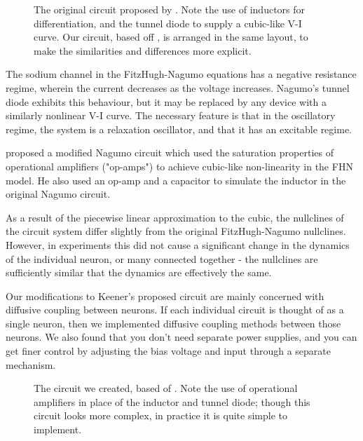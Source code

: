\documentclass[
    11pt,
]{article}
\begin{document}
\begin{figure}[h!]
    \centering
    \caption{The original circuit proposed by \citet{nagumo1962}.  Note the use of inductors for differentiation, and the tunnel diode to supply a cubic-like V-I curve.  Our circuit, based off \citet{keener1983}, is arranged in the same layout, to make the similarities and differences more explicit.}
    \label{fig: nagumo_ckt}
\end{figure}


The sodium channel in the FitzHugh-Nagumo equations has a negative resistance regime, wherein the current decreases as the voltage increases.  Nagumo's tunnel diode exhibits this behaviour, but it may be replaced by any device with a similarly nonlinear V-I curve.  The necessary feature is that in the oscillatory regime, the system is a relaxation oscillator, and that it has an excitable regime.

\citet{keener1983} proposed a modified Nagumo circuit which used the saturation properties of operational amplifiers ("op-amps") to achieve cubic-like non-linearity in the FHN model. He also used an op-amp and a capacitor to simulate the inductor in the original Nagumo circuit.

As a result of the piecewise linear approximation to the cubic, the nullclines of the circuit system differ slightly from the original FitzHugh-Nagumo nullclines.  However, in experiments this did not cause a significant change in the dynamics of the individual neuron, or many connected together - the nullclines are sufficiently similar that the dynamics are effectively the same.

Our modifications to Keener's proposed circuit are mainly concerned with diffusive coupling between neurons.  If each individual circuit is thought of as a single neuron, then we implemented diffusive coupling methods between those neurons.  We also found that you don't need separate power supplies, and you can get finer control by adjusting the bias voltage and input through a separate mechanism.

\begin{figure}[h!]
    \centering
    \caption{The circuit we created, based of \citet{keener1983}.  Note the use of operational amplifiers in place of the inductor and tunnel diode; though this circuit looks more complex, in practice it is quite simple to implement.}
    \label{fig: neuron_unit}
\end{figure}
\end{document}
